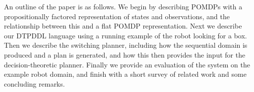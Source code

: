 An outline of the paper is as follows. We begin by describing POMDPs with a
propositionally factored representation of states and observations,
and the relationship between this and a flat POMDP representation. Next
we describe our DTPDDL language using a running example of the robot
looking for a box. Then we describe the switching planner, including
how the sequential domain is produced and a plan is generated, and how
this then provides the input for the decision-theoretic
planner. Finally we provide an evaluation of the system on the example
robot domain, and finish with a short survey of related work and some
concluding remarks.

